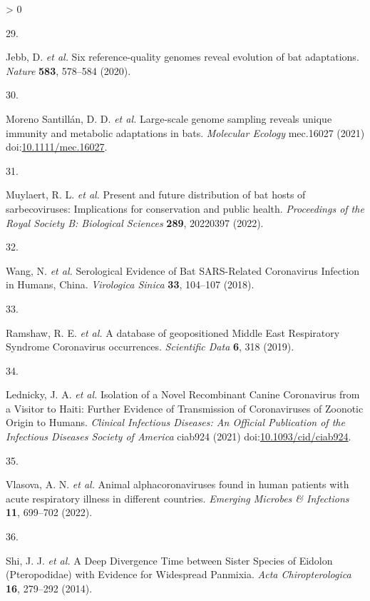 \documentclass[10pt,oneside]{article}
\newlength{\cslhangindent}
\newlength{\csllabelwidth}
\newenvironment{CSLReferences}[3] %
 {%
  \setlength{\parindent}{0pt}
  \ifodd #1 \everypar{\setlength{\hangindent}{\cslhangindent}}\ignorespaces\fi
  \ifnum #2 > 0
  \setlength{\parskip}{#2\baselineskip}
  \fi
 }%
 {}
\newcommand{\CSLLeftMargin}[1]{\parbox[t]{\maxof{\widthof{#1}}{\csllabelwidth}}{#1}}
\newcommand{\CSLRightInline}[1]{\parbox[t]{\linewidth}{#1}}
\begin{document}
\begin{CSLReferences}{0}{0}
\leavevmode\hypertarget{ref-Jebb2020SixRef}{}%
\CSLLeftMargin{29. }
\CSLRightInline{Jebb, D. \emph{et al.} Six reference-quality genomes
reveal evolution of bat adaptations. \emph{Nature} \textbf{583},
578--584 (2020).}

\leavevmode\hypertarget{ref-MorenoSantillan2021LarGen}{}%
\CSLLeftMargin{30. }
\CSLRightInline{Moreno Santillán, D. D. \emph{et al.} Large-scale genome
sampling reveals unique immunity and metabolic adaptations in bats.
\emph{Molecular Ecology} mec.16027 (2021)
doi:\href{https://doi.org/10.1111/mec.16027}{10.1111/mec.16027}.}

\leavevmode\hypertarget{ref-Muylaert2022PreFut}{}%
\CSLLeftMargin{31. }
\CSLRightInline{Muylaert, R. L. \emph{et al.} Present and future
distribution of bat hosts of sarbecoviruses: Implications for
conservation and public health. \emph{Proceedings of the Royal Society
B: Biological Sciences} \textbf{289}, 20220397 (2022).}

\leavevmode\hypertarget{ref-Wang2018SerEvi}{}%
\CSLLeftMargin{32. }
\CSLRightInline{Wang, N. \emph{et al.} Serological Evidence of Bat
SARS-Related Coronavirus Infection in Humans, China. \emph{Virologica
Sinica} \textbf{33}, 104--107 (2018).}

\leavevmode\hypertarget{ref-Ramshaw2019DatGeo}{}%
\CSLLeftMargin{33. }
\CSLRightInline{Ramshaw, R. E. \emph{et al.} A database of geopositioned
Middle East Respiratory Syndrome Coronavirus occurrences.
\emph{Scientific Data} \textbf{6}, 318 (2019).}

\leavevmode\hypertarget{ref-Lednicky2021IsoNov}{}%
\CSLLeftMargin{34. }
\CSLRightInline{Lednicky, J. A. \emph{et al.} Isolation of a Novel
Recombinant Canine Coronavirus from a Visitor to Haiti: Further Evidence
of Transmission of Coronaviruses of Zoonotic Origin to Humans.
\emph{Clinical Infectious Diseases: An Official Publication of the
Infectious Diseases Society of America} ciab924 (2021)
doi:\href{https://doi.org/10.1093/cid/ciab924}{10.1093/cid/ciab924}.}

\leavevmode\hypertarget{ref-Vlasova2022AniAlp}{}%
\CSLLeftMargin{35. }
\CSLRightInline{Vlasova, A. N. \emph{et al.} Animal alphacoronaviruses
found in human patients with acute respiratory illness in different
countries. \emph{Emerging Microbes \& Infections} \textbf{11}, 699--702
(2022).}

\leavevmode\hypertarget{ref-Shi2014DeeDiv}{}%
\CSLLeftMargin{36. }
\CSLRightInline{Shi, J. J. \emph{et al.} A Deep Divergence Time between
Sister Species of Eidolon (Pteropodidae) with Evidence for Widespread
Panmixia. \emph{Acta Chiropterologica} \textbf{16}, 279--292 (2014).}


\end{CSLReferences}
\end{document}
